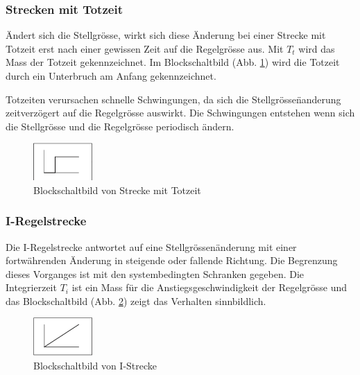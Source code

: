 \subsubsection*{Strecken mit Totzeit}
\"Andert  sich  die  Stellgr\"osse,  wirkt sich  diese  \"Anderung  bei  einer
Strecke  mit Totzeit  erst  nach  einer gewissen  Zeit  auf die  Regelgr\"osse
aus. Mit $T_t$  wird das  Mass der Totzeit  gekennzeichnet. Im Blockschaltbild
(Abb.  \ref{fig:TotZeit}) wird  die  Totzeit durch  ein  Unterbruch am  Anfang
gekennzeichnet.

Totzeiten     verursachen    schnelle     Schwingungen,     da    sich     die
Stellgr\"osse\"nanderung zeitverz\"ogert  auf die  Regelgr\"osse auswirkt. Die
Schwingungen  entstehen  wenn sich  die  Stellgr\"osse  und die  Regelgr\"osse
periodisch \"andern.

\begin{figure}[h!, width=\pagewidth]
    \centering
    \includegraphics[width=0.2\textwidth]{images/TotZeit}
    \caption{Blockschaltbild von Strecke mit Totzeit}
    \label{fig:TotZeit}
\end{figure}


\subsubsection*{I-Regelstrecke}
Die  I-Regelstrecke  antwortet  auf eine  Stellgr\"ossen\"anderung  mit  einer
fortw\"ahrenden \"Anderung in steigende oder fallende Richtung. Die Begrenzung
dieses   Vorganges  ist   mit  den   systembedingten  Schranken   gegeben. Die
Integrierzeit  $T_i$  ist  ein  Mass  f\"ur  die  Anstiegsgeschwindigkeit  der
Regelgr\"osse  und das  Blockschaltbild  (Abb.  \ref{fig:IStrecke}) zeigt  das
Verhalten sinnbildlich.

\begin{figure}[h!, width=\pagewidth]
    \centering
    \includegraphics[width=0.2\textwidth]{images/IStrecke}
    \caption{Blockschaltbild von I-Strecke}
    \label{fig:IStrecke}
\end{figure}


